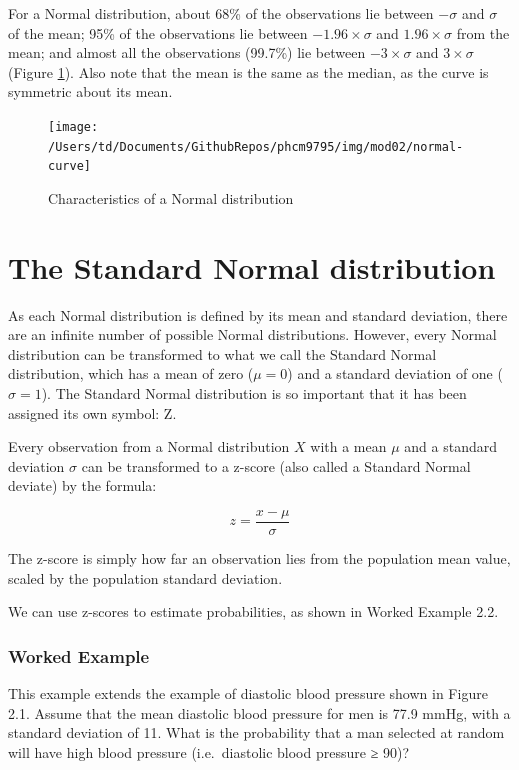\documentclass[
]{memoir}
\begin{document}
For a Normal distribution, about 68\% of the observations lie between \(- \sigma\) and \(\sigma\) of the mean; 95\% of the observations lie between \(−1.96 \times \sigma\) and \(1.96 \times \sigma\) from the mean; and almost all the observations (99.7\%) lie between \(-3 \times \sigma\) and \(3 \times \sigma\) (Figure \ref{fig:fig-2-3}). Also note that the mean is the same as the median, as the curve is symmetric about its mean.

\begin{figure}
\texttt{[image: /Users/td/Documents/GithubRepos/phcm9795/img/mod02/normal-curve]} \caption{Characteristics of a Normal distribution}\label{fig:fig-2-3}
\end{figure}

\hypertarget{the-standard-normal-distribution}{%
\section{The Standard Normal distribution}\label{the-standard-normal-distribution}}

As each Normal distribution is defined by its mean and standard deviation, there are an infinite number of possible Normal distributions. However, every Normal distribution can be transformed to what we call the Standard Normal distribution, which has a mean of zero (\(\mu = 0\)) and a standard deviation of one (\(\sigma = 1\)). The Standard Normal distribution is so important that it has been assigned its own symbol: Z.

Every observation from a Normal distribution \(X\) with a mean \(\mu\) and a standard deviation \(\sigma\) can be transformed to a z-score (also called a Standard Normal deviate) by the formula:

\[ z = \frac{x - \mu}{\sigma} \]

The z-score is simply how far an observation lies from the population mean value, scaled by the population standard deviation.

We can use z-scores to estimate probabilities, as shown in Worked Example 2.2.

\hypertarget{worked-example-3}{%
\subsubsection*{Worked Example}\label{worked-example-3}}

This example extends the example of diastolic blood pressure shown in Figure 2.1. Assume that the mean diastolic blood pressure for men is 77.9 mmHg, with a standard deviation of 11. What is the probability that a man selected at random will have high blood pressure (i.e.~diastolic blood pressure ≥ 90)?
\end{document}
